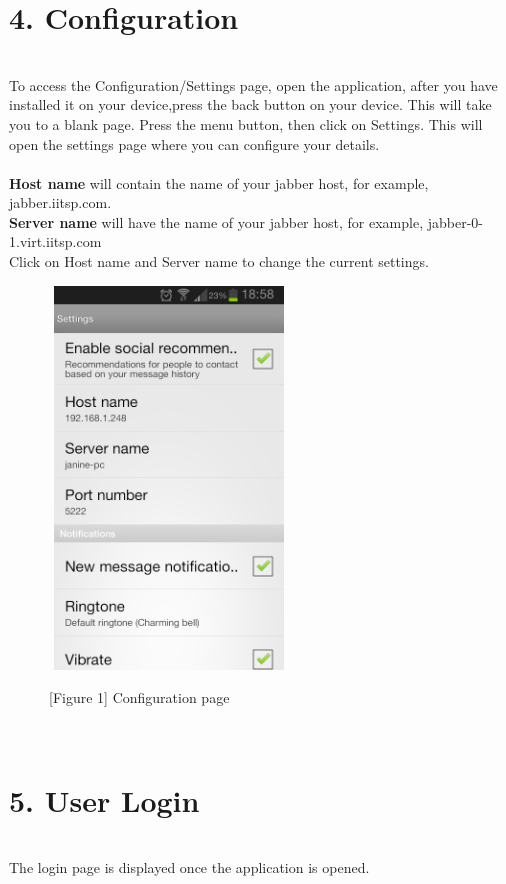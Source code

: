 \documentclass[29pt,a4paper]{moderncv}
\begin{document}
\newpage
	\section*{4. Configuration}
	\\To access the Configuration/Settings page, open the application, after you have installed it on your device,press the back button on your device. This will take you to a blank page. Press the menu button, then click on Settings. This will open the settings page where you can configure your details. \\
	\\\textbf{Host name} will contain the name of your jabber host, for example, jabber.iitsp.com. 
	\\\textbf{Server name} will have the name of your jabber host, for example, jabber-0-1.virt.iitsp.com\\
	 Click on Host name and Server name to change the current settings.
	
	\noindent\begin{figure}
					\centering
					\includegraphics[width=2.5in, height=4.0in]{./Screenshot_2013-10-23-18-58-53.png} \\
					\centering \caption{[Figure 1] Configuration page}
					\end{figure}\\ 
\newpage
		
\newpage
		\section*{5. User Login}
		\vspace{4mm}
		\\The login page is displayed once the application is opened.  
		
\end{document}
